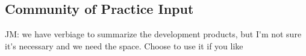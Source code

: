 


\subsection{Community of Practice Input}

\label{sec:stakeholder}

\ac{ JM: we have verbiage to summarize the development products, but I'm not sure it's necessary and we need the space. Choose to use it if you like}
\begin{comment}


Our data-driven, scalable solution will close some significant travel information gaps for Deaf-blind commuters by providing
\begin{description}
    \item [Product 1: Tangible Map Design] Enhanced pedestrian accessibility information along sidewalk trip segments customized to individual's abilities (for example, the tactile maps can indicate which curb ramps have tactile surfaces, which Accessible Pedestrian Signals include a tactile plate, or the direction of incline of the block, all of which, we have found through our pilot, are critical for orientation and navigation to our population of interest).
    \item[Product 1:  Tangible Map Design] A method for generating \textit{optimal, custom} tactile maps with an accessible tool for generating these maps.
    \item[Product 2: Web Interaction] A method for \textit{indicating user needs} such as trip-purpose and other preferences in order to properly optimize the tactile features for specific travel use. This allows creation of maps that support completely different types of travel, for instance, neighborhood point-of-interest exploration and multimodal trip-planning integrating on-demand, community transportation and other vehicle segments for which GTFS feeds are available.
    \item[Product 3: Updates] A 'subscription service' to a geographical travel area, whereby users can receive e-mail alerts and reporting of real-time transit information and impacted itineraries (e.g. vehicle delays, trip reroutes, trip cancellations, reported sidewalk closures). 
\end{description}

\end{comment}

